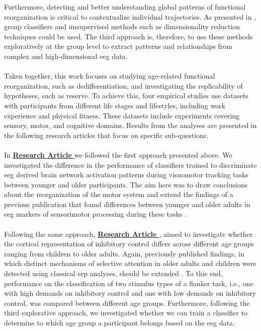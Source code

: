 Furthermore, detecting and better understanding global patterns of functional reorganization is critical to contextualize individual trajectories. As presented in , group classifiers and unsupervised methods such as dimensionality reduction techniques could be used. The third approach is, therefore, to use these methods exploratively at the group level to extract patterns and relationships from complex and high-dimensional \gls{eeg} data.\\
\\
Taken together, this work focuses on studying age-related functional reorganization, such as dedifferentiation, and investigating the replicability of hypotheses, such as reserve. To achieve this, four empirical studies use datasets with participants from different life stages and lifestyles, including work experience and physical fitness. These datasets include experiments covering sensory, motor, and cognitive domains. Results from the analyses are presented in the following research articles that focus on specific sub-questions.\\
\\
In \textbf{\hyperref[pub:paperI]{Research Article }} we followed the first approach presented above. We investigated the difference in the performance of classifiers trained to discriminate \gls{eeg} derived brain network activation patterns during visuomotor tracking tasks between younger and older participants. The aim here was to draw conclusions about the reorganization of the motor system and extend the findings of a previous publication that found differences between younger and older adults in \gls{eeg} markers of sensorimotor processing during these tasks \cite{Vieluf2018}.\\
\\
Following the same approach, \textbf{\hyperref[pub:paperII]{Research Article }}, aimed to investigate whether the cortical representation of inhibitory control differs across different age groups ranging from children to older adults. Again, previously published findings, in which distinct mechanisms of selective attention in older adults and children were detected using classical \gls{erp} analyses, should be extended \cite{Reuter2019}. To this end, performance on the classification of two stimulus types of a flanker task, i.e., one with high demands on inhibitory control and one with low demands on inhibitory control, was compared between different age groups. Furthermore, following the third explorative approach, we investigated whether we can train a classifier to determine to which age group a participant belongs based on the \gls{eeg} data.\\
